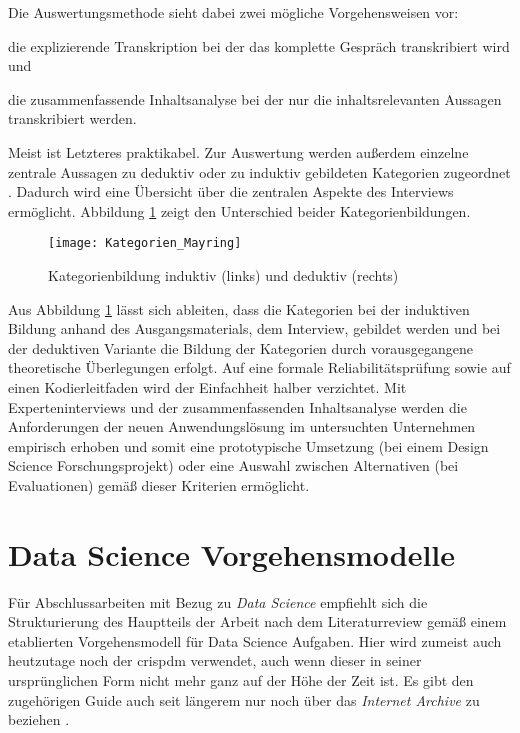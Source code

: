 Die Auswertungsmethode sieht dabei zwei mögliche Vorgehensweisen vor:
%
\begin{compactenum}
\item die explizierende Transkription bei der das komplette Gespräch transkribiert wird und
\item die zusammenfassende Inhaltsanalyse bei der nur die inhaltsrelevanten Aussagen transkribiert werden.
\end{compactenum}
%
Meist ist Letzteres praktikabel. Zur Auswertung werden außerdem einzelne zentrale
Aussagen zu deduktiv oder zu induktiv gebildeten Kategorien zugeordnet \parencite[s.][]{Mayring2010}.
Dadurch wird eine Übersicht über die zentralen Aspekte des Interviews ermöglicht. Abbildung 
\ref{fig:Interviewkategorien} zeigt den Unterschied beider Kategorienbildungen.
%
\begin{figure}[H]
\label{fig:Interviewkategorien}
\begin{center}
\texttt{[image: Kategorien\_Mayring]}
\end{center}
\caption{Kategorienbildung induktiv (links) und deduktiv (rechts) \parencite[eigene Darstellung nach][]{Mayring1994}}
\end{figure}
%
Aus Abbildung \ref{fig:Interviewkategorien} lässt sich ableiten, dass die Kategorien bei der
induktiven Bildung anhand des Ausgangsmaterials, dem Interview, gebildet werden und bei der
deduktiven Variante die Bildung der Kategorien durch vorausgegangene theoretische
Überlegungen erfolgt. Auf eine formale Reliabilitätsprüfung sowie auf einen Kodierleitfaden
wird der Einfachheit halber verzichtet.
Mit Experteninterviews und der zusammenfassenden Inhaltsanalyse werden die
Anforderungen der neuen Anwendungslösung im untersuchten Unternehmen empirisch
erhoben und somit eine prototypische Umsetzung (bei einem Design Science Forschungsprojekt)
oder eine Auswahl zwischen Alternativen (bei Evaluationen)
gemäß dieser Kriterien ermöglicht.
%
\section{Data Science Vorgehensmodelle}
\label{sec:FM-DataScienceVorgehen}
%
Für Abschlussarbeiten mit Bezug zu \emph{Data Science} empfiehlt sich die Strukturierung des
Hauptteils der Arbeit nach dem Literaturreview gemäß einem etablierten Vorgehensmodell für
Data Science Aufgaben. Hier wird zumeist auch heutzutage noch der \gls{crispdm} verwendet,
auch wenn dieser in seiner ursprünglichen Form nicht mehr ganz auf der Höhe der Zeit ist. Es
gibt den zugehörigen Guide auch seit längerem nur noch über das \emph{Internet Archive} zu
beziehen \parencite[s.~][]{Chapman1999}.


